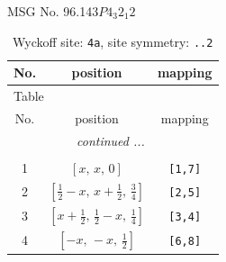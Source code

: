 \documentclass[fleqn,8pt]{jsarticle}
\begin{document}
\setcounter{MaxMatrixCols}{32}

\renewcommand{\tablename}{Table~}
\renewcommand{\figurename}{Figure~}
\begin{center}
\LARGE
MSG No. 96.143\quad$P4_{3}2_{1}2$
\end{center}
\renewcommand{\arraystretch}{1.2}
\begin{longtable}{ccc}
\caption{Wyckoff site: {\tt 4a}, site symmetry: {\tt ..2}}
 \\
 \hline \hline
No. & position & mapping \\ \hline \endfirsthead

\multicolumn{2}{l}{\tablename\ \thetable{}} \\
 \hline \hline
No. & position & mapping \\ \hline \endhead

 \hline \hline
\multicolumn{2}{r}{\footnotesize\it continued ...} \\ \endfoot

 \hline \hline
\multicolumn{2}{r}{} \\ \endlastfoot

1 & $\left[ x,\, x,\, 0 \right]$ & {\tt [1,7]} \\ \hline
2 & $\left[ \frac{1}{2} - x,\, x + \frac{1}{2},\, \frac{3}{4} \right]$ & {\tt [2,5]} \\ \hline
3 & $\left[ x + \frac{1}{2},\, \frac{1}{2} - x,\, \frac{1}{4} \right]$ & {\tt [3,4]} \\ \hline
4 & $\left[ - x,\, - x,\, \frac{1}{2} \right]$ & {\tt [6,8]} \\
\end{longtable}
\renewcommand{\arraystretch}{1.2}
\end{document}
